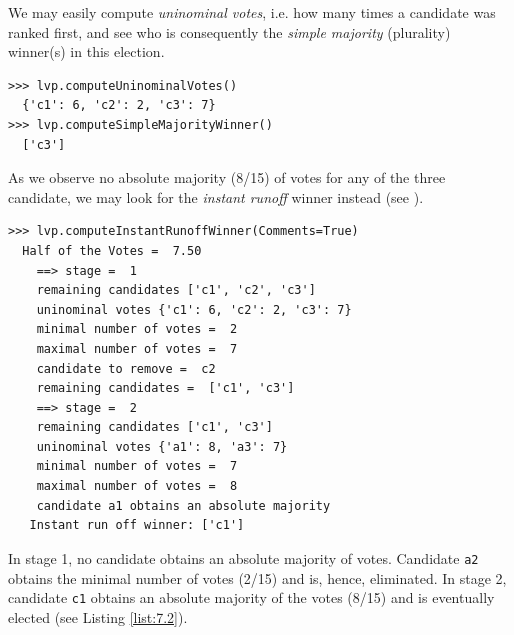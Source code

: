 We may easily compute \emph{uninominal votes}, i.e. how many times a candidate was ranked first, and see who is consequently the \emph{simple majority} (plurality) winner(s) in this election.
\begin{lstlisting}
>>> lvp.computeUninominalVotes()
  {'c1': 6, 'c2': 2, 'c3': 7}
>>> lvp.computeSimpleMajorityWinner()
  ['c3']
\end{lstlisting}

As we observe no absolute majority (8/15) of votes for any of the three candidate, we may look for the \emph{instant runoff} winner instead (see \citet{ADT-L2}).
\begin{lstlisting}[caption={Example Instant Run Off Winner},label=list:7.2]
>>> lvp.computeInstantRunoffWinner(Comments=True)
  Half of the Votes =  7.50
    ==> stage =  1
	remaining candidates ['c1', 'c2', 'c3']
	uninominal votes {'c1': 6, 'c2': 2, 'c3': 7}
	minimal number of votes =  2
	maximal number of votes =  7
	candidate to remove =  c2
	remaining candidates =  ['c1', 'c3']
    ==> stage =  2
	remaining candidates ['c1', 'c3']
	uninominal votes {'a1': 8, 'a3': 7}
	minimal number of votes =  7
	maximal number of votes =  8
	candidate a1 obtains an absolute majority
   Instant run off winner: ['c1']
 \end{lstlisting}
In stage 1, no candidate obtains an absolute majority of votes. Candidate \texttt{a2} obtains the minimal number of votes (2/15) and is, hence, eliminated. In stage 2, candidate \texttt{c1} obtains an absolute majority of the votes (8/15) and is eventually elected (see Listing \ref{list:7.2}).

